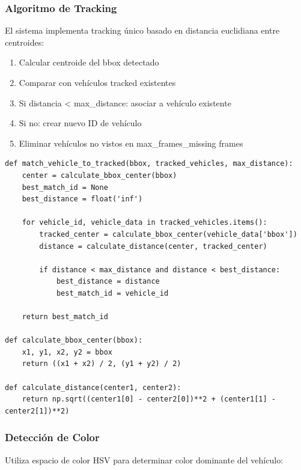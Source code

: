 \documentclass[12pt,a4paper]{article}
\begin{document}
\subsubsection{Algoritmo de Tracking}

El sistema implementa tracking único basado en distancia euclidiana entre centroides:

\begin{enumerate}
    \item Calcular centroide del bbox detectado
    \item Comparar con vehículos tracked existentes
    \item Si distancia \textless{} max\_distance: asociar a vehículo existente
    \item Si no: crear nuevo ID de vehículo
    \item Eliminar vehículos no vistos en max\_frames\_missing frames
\end{enumerate}

\begin{lstlisting}[caption={Algoritmo de Tracking}, style=pythonstyle, label=lst:tracking]
def match_vehicle_to_tracked(bbox, tracked_vehicles, max_distance):
    center = calculate_bbox_center(bbox)
    best_match_id = None
    best_distance = float('inf')
    
    for vehicle_id, vehicle_data in tracked_vehicles.items():
        tracked_center = calculate_bbox_center(vehicle_data['bbox'])
        distance = calculate_distance(center, tracked_center)
        
        if distance < max_distance and distance < best_distance:
            best_distance = distance
            best_match_id = vehicle_id
    
    return best_match_id

def calculate_bbox_center(bbox):
    x1, y1, x2, y2 = bbox
    return ((x1 + x2) / 2, (y1 + y2) / 2)

def calculate_distance(center1, center2):
    return np.sqrt((center1[0] - center2[0])**2 + (center1[1] - center2[1])**2)
\end{lstlisting}

\subsubsection{Detección de Color}

Utiliza espacio de color HSV para determinar color dominante del vehículo:
\end{document}
